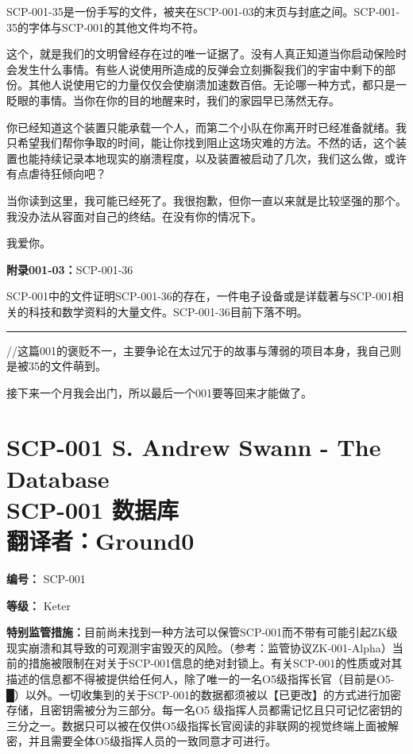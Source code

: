 \documentclass[openany,a4paper]{book} %
\newcounter{mychapter} %
\begin{document}
\vspace{8pt}

SCP-001-35是一份手写的文件，被夹在SCP-001-03的末页与封底之间。SCP-001-35的字体与SCP-001的其他文件均不符。
\begin{colorboxed}
这个，就是我们的文明曾经存在过的唯一证据了。没有人真正知道当你启动保险时会发生什么事情。有些人说使用所造成的反弹会立刻撕裂我们的宇宙中剩下的部份。其他人说使用它的力量仅仅会使崩溃加速数百倍。无论哪一种方式，都只是一眨眼的事情。当你在你的目的地醒来时，我们的家园早已荡然无存。\vspace{12pt}

你已经知道这个装置只能承载一个人，而第二个小队在你离开时已经准备就绪。我只希望我们帮你争取的时间，能让你找到阻止这场灾难的方法。不然的话，这个装置也能持续记录本地现实的崩溃程度，以及装置被启动了几次，我们这么做，或许有点虐待狂倾向吧？\vspace{12pt}

当你读到这里，我可能已经死了。我很抱歉，但你一直以来就是比较坚强的那个。我没办法从容面对自己的终结。在没有你的情况下。\vspace{12pt}

我爱你。
\end{colorboxed}

\textbf{附录001-03：}SCP-001-36

SCP-001中的文件证明SCP-001-36的存在，一件电子设备或是详载著与SCP-001相关的科技和数学资料的大量文件。SCP-001-36目前下落不明。\vspace{12pt}

\hrule\vspace{12pt}

//这篇001的褒贬不一，主要争论在太过冗于的故事与薄弱的项目本身，我自己则是被35的文件萌到。

接下来一个月我会出门，所以最后一个001要等回来才能做了。

\addtocounter{mychapter}{1}
\chapter[SCP-001 数据库]{SCP-001 S. Andrew Swann - The Database \\ SCP-001 数据库 \\ 翻译者：Ground0}\label{chap:SCP-001-8}
\textbf{编号：} SCP-001\vspace{12pt}

\textbf{等级：} Keter\vspace{12pt}

\textbf{特别监管措施：}目前尚未找到一种方法可以保管SCP-001而不带有可能引起ZK级现实崩溃和其导致的可观测宇宙毁灭的风险。（参考：监管协议ZK-001-Alpha）当前的措施被限制在对关于SCP-001信息的绝对封锁上。有关SCP-001的性质或对其描述的信息都不得被提供给任何人，除了唯一的一名O5级指挥长官（目前是O5-█）以外。一切收集到的关于SCP-001的数据都须被以【已更改】的方式进行加密存储，且密钥需被分为三部分。每一名O5 级指挥人员都需记忆且只可记忆密钥的三分之一。数据只可以被在仅供O5级指挥长官阅读的非联网的视觉终端上面被解密，并且需要全体O5级指挥人员的一致同意才可进行。\vspace{12pt}
\end{document}
